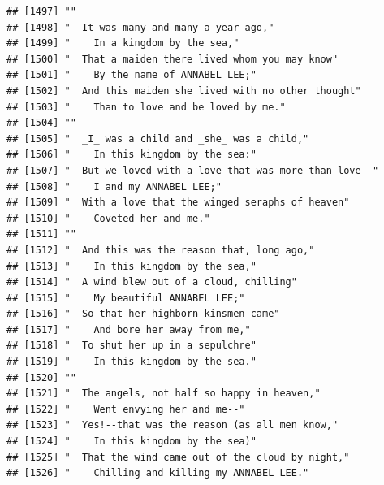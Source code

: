 \documentclass{article}\usepackage[]{graphicx}\usepackage[]{color}
\makeatletter
\newenvironment{kframe}{%
 \def\at@end@of@kframe{}%
 \ifinner\ifhmode%
  \def\at@end@of@kframe{\end{minipage}}%
  \begin{minipage}{\columnwidth}%
 \fi\fi%
 \def\FrameCommand##1{\hskip\@totalleftmargin \hskip-\fboxsep
 \colorbox{shadecolor}{##1}\hskip-\fboxsep
     \hskip-\linewidth \hskip-\@totalleftmargin \hskip\columnwidth}%
 \MakeFramed {\advance\hsize-\width
   \@totalleftmargin\z@ \linewidth\hsize
   \@setminipage}}%
 {\par\unskip\endMakeFramed%
 \at@end@of@kframe}
\newenvironment{knitrout}{}{} %
\makeatother
\begin{document}
\begin{knitrout}
\begin{kframe}
\begin{verbatim}
## [1497] ""                                                                            
## [1498] "  It was many and many a year ago,"                                          
## [1499] "    In a kingdom by the sea,"                                                
## [1500] "  That a maiden there lived whom you may know"                               
## [1501] "    By the name of ANNABEL LEE;"                                             
## [1502] "  And this maiden she lived with no other thought"                           
## [1503] "    Than to love and be loved by me."                                        
## [1504] ""                                                                            
## [1505] "  _I_ was a child and _she_ was a child,"                                    
## [1506] "    In this kingdom by the sea:"                                             
## [1507] "  But we loved with a love that was more than love--"                        
## [1508] "    I and my ANNABEL LEE;"                                                   
## [1509] "  With a love that the winged seraphs of heaven"                             
## [1510] "    Coveted her and me."                                                     
## [1511] ""                                                                            
## [1512] "  And this was the reason that, long ago,"                                   
## [1513] "    In this kingdom by the sea,"                                             
## [1514] "  A wind blew out of a cloud, chilling"                                      
## [1515] "    My beautiful ANNABEL LEE;"                                               
## [1516] "  So that her highborn kinsmen came"                                         
## [1517] "    And bore her away from me,"                                              
## [1518] "  To shut her up in a sepulchre"                                             
## [1519] "    In this kingdom by the sea."                                             
## [1520] ""                                                                            
## [1521] "  The angels, not half so happy in heaven,"                                  
## [1522] "    Went envying her and me--"                                               
## [1523] "  Yes!--that was the reason (as all men know,"                               
## [1524] "    In this kingdom by the sea)"                                             
## [1525] "  That the wind came out of the cloud by night,"                             
## [1526] "    Chilling and killing my ANNABEL LEE."                                    

\end{verbatim}
\end{kframe}
\end{knitrout}
\end{document}
